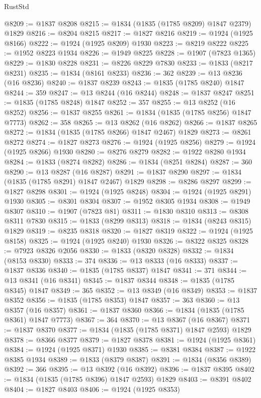 \begin{lexlean}{RustStd}
\begin{coremodule}
@8209 := @1837 @8208
@8215 := @1834 (@1835 (@1785 @8209) @1847 @2379) @1829
@8216 := @8204 @8215
@8217 := @1827 @8216
@8219 := @1924 (@1925 @8166)
@8222 := @1924 (@1925 @8209) @1930
@8223 := @8219 @8222
@8225 := @1952 @8223 @1934
@8226 := @1949 @8225
@8228 := @1907 (@7823 @1365)
@8229 := @1830 @8228
@8231 := @8226 @8229 @7830
@8233 := @1833 (@8217 @8231)
@8235 := @1834 (@8161 @8233)
@8236 := 362
@8239 := @13 @8236 (@16 @8236)
@8240 := @1837 @8239
@8243 := @1835 (@1785 @8240) @1847
@8244 := 359
@8247 := @13 @8244 (@16 @8244)
@8248 := @1837 @8247
@8251 := @1835 (@1785 @8248) @1847
@8252 := 357
@8255 := @13 @8252 (@16 @8252)
@8256 := @1837 @8255
@8261 := @1834 (@1835 (@1785 @8256) @1847 @7773)
@8262 := 358
@8265 := @13 @8262 (@16 @8262)
@8266 := @1837 @8265
@8272 := @1834 (@1835 (@1785 @8266) @1847 @2467) @1829
@8273 := @8261 @8272
@8274 := @1827 @8273
@8276 := @1924 (@1925 @8256)
@8279 := @1924 (@1925 @8266) @1930
@8280 := @8276 @8279
@8282 := @1922 @8280 @1934
@8284 := @1833 (@8274 @8282)
@8286 := @1834 (@8251 @8284)
@8287 := 360
@8290 := @13 @8287 (@16 @8287)
@8291 := @1837 @8290
@8297 := @1834 (@1835 (@1785 @8291) @1847 @2467) @1829
@8298 := @8286 @8297
@8299 := @1827 @8298
@8301 := @1924 (@1925 @8248)
@8304 := @1924 (@1925 @8291) @1930
@8305 := @8301 @8304
@8307 := @1952 @8305 @1934
@8308 := @1949 @8307
@8310 := @1907 (@7823 @81)
@8311 := @1830 @8310
@8313 := @8308 @8311 @7830
@8315 := @1833 (@8299 @8313)
@8318 := @1834 (@8243 @8315) @1829
@8319 := @8235 @8318
@8320 := @1827 @8319
@8322 := @1924 (@1925 @8158)
@8325 := @1924 (@1925 @8240) @1930
@8326 := @8322 @8325
@8328 := @7923 @8326 @2056
@8330 := @1833 (@8320 @8328)
@8332 := @1834 (@8153 @8330)
@8333 := 374
@8336 := @13 @8333 (@16 @8333)
@8337 := @1837 @8336
@8340 := @1835 (@1785 @8337) @1847
@8341 := 371
@8344 := @13 @8341 (@16 @8341)
@8345 := @1837 @8344
@8348 := @1835 (@1785 @8345) @1847
@8349 := 365
@8352 := @13 @8349 (@16 @8349)
@8353 := @1837 @8352
@8356 := @1835 (@1785 @8353) @1847
@8357 := 363
@8360 := @13 @8357 (@16 @8357)
@8361 := @1837 @8360
@8366 := @1834 (@1835 (@1785 @8361) @1847 @7773)
@8367 := 364
@8370 := @13 @8367 (@16 @8367)
@8371 := @1837 @8370
@8377 := @1834 (@1835 (@1785 @8371) @1847 @2593) @1829
@8378 := @8366 @8377
@8379 := @1827 @8378
@8381 := @1924 (@1925 @8361)
@8384 := @1924 (@1925 @8371) @1930
@8385 := @8381 @8384
@8387 := @1922 @8385 @1934
@8389 := @1833 (@8379 @8387)
@8391 := @1834 (@8356 @8389)
@8392 := 366
@8395 := @13 @8392 (@16 @8392)
@8396 := @1837 @8395
@8402 := @1834 (@1835 (@1785 @8396) @1847 @2593) @1829
@8403 := @8391 @8402
@8404 := @1827 @8403
@8406 := @1924 (@1925 @8353)

\end{coremodule}
\end{lexlean}
